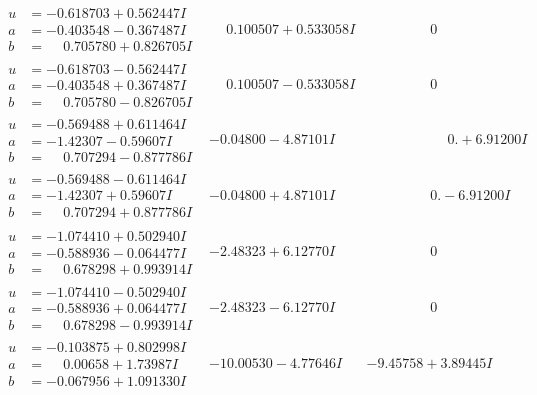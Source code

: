\documentclass[1p]{elsarticle_modified}
\theoremstyle{definition}
\begin{document}
$$\begin{array}{c|c|c}
\begin{aligned}
u &= -0.618703 + 0.562447 I \\
a &= -0.403548 - 0.367487 I \\
b &= \phantom{-}0.705780 + 0.826705 I\end{aligned}
 & \phantom{-}0.100507 + 0.533058 I & \phantom{-0.000000 } 0 \\ \hline\begin{aligned}
u &= -0.618703 - 0.562447 I \\
a &= -0.403548 + 0.367487 I \\
b &= \phantom{-}0.705780 - 0.826705 I\end{aligned}
 & \phantom{-}0.100507 - 0.533058 I & \phantom{-0.000000 } 0 \\ \hline\begin{aligned}
u &= -0.569488 + 0.611464 I \\
a &= -1.42307 - 0.59607 I \\
b &= \phantom{-}0.707294 - 0.877786 I\end{aligned}
 & -0.04800 - 4.87101 I & \phantom{-0.000000 -}0. + 6.91200 I \\ \hline\begin{aligned}
u &= -0.569488 - 0.611464 I \\
a &= -1.42307 + 0.59607 I \\
b &= \phantom{-}0.707294 + 0.877786 I\end{aligned}
 & -0.04800 + 4.87101 I & \phantom{-0.000000 } 0. - 6.91200 I \\ \hline\begin{aligned}
u &= -1.074410 + 0.502940 I \\
a &= -0.588936 - 0.064477 I \\
b &= \phantom{-}0.678298 + 0.993914 I\end{aligned}
 & -2.48323 + 6.12770 I & \phantom{-0.000000 } 0 \\ \hline\begin{aligned}
u &= -1.074410 - 0.502940 I \\
a &= -0.588936 + 0.064477 I \\
b &= \phantom{-}0.678298 - 0.993914 I\end{aligned}
 & -2.48323 - 6.12770 I & \phantom{-0.000000 } 0 \\ \hline\begin{aligned}
u &= -0.103875 + 0.802998 I \\
a &= \phantom{-}0.00658 + 1.73987 I \\
b &= -0.067956 + 1.091330 I\end{aligned}
 & -10.00530 - 4.77646 I & -9.45758 + 3.89445 I \\ \hline\begin{aligned}

\end{aligned}
\end{array}$$
\end{document}
